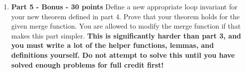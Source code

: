 \documentclass{article}
\begin{document}
\begin{enumerate}
\item \textbf{Part 5 - Bonus - 30 points} Define a new appropriate loop invariant for your new theorem defined in part 4. Prove that your theorem holds for the given
merge function. You are allowed to modify the merge function if that makes this part simpler. \textbf{This is significantly harder than part 3, and you must write
a lot of the helper functions, lemmas, and definitions yourself. Do not attempt to solve this until you have solved enough problems for full credit first!}

\end{enumerate}
\end{document}
